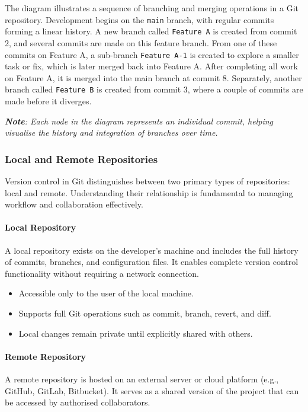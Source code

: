 \documentclass{article}
\newcommand{\codecmd}[1]{\textcolor[rgb]{0,0.5,0}{\texttt{#1}}}
\begin{document}
\noindent
The diagram illustrates a sequence of branching and merging operations in a Git repository. Development begins on the \codecmd{main} branch, with regular commits forming a linear history. A new branch called \codecmd{Feature A} is created from commit 2, and several commits are made on this feature branch. From one of these commits on Feature A, a sub-branch \codecmd{Feature A-1} is created to explore a smaller task or fix, which is later merged back into Feature A. After completing all work on Feature A, it is merged into the main branch at commit 8. Separately, another branch called \codecmd{Feature B} is created from commit 3, where a couple of commits are made before it diverges. 

\vspace{1em}
\textit{\textbf{Note}: Each node in the diagram represents an individual commit, helping visualise the history and integration of branches over time.
}
\subsubsection{Local and Remote Repositories}

Version control in Git distinguishes between two primary types of repositories: local and remote. Understanding their relationship is fundamental to managing workflow and collaboration effectively.

\paragraph*{Local Repository}
A local repository exists on the developer's machine and includes the full history of commits, branches, and configuration files. It enables complete version control functionality without requiring a network connection.

\begin{itemize}
    \item Accessible only to the user of the local machine.
    \item Supports full Git operations such as commit, branch, revert, and diff.
    \item Local changes remain private until explicitly shared with others.
\end{itemize}

\paragraph*{Remote Repository}
A remote repository is hosted on an external server or cloud platform (e.g., GitHub, GitLab, Bitbucket). It serves as a shared version of the project that can be accessed by authorised collaborators.
\end{document}
